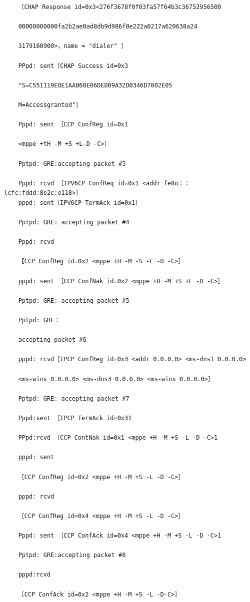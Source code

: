 \begin{verbatim}
    ［CHAP Response id=0x3<276f3678f0f03fa57f64b3c36752956500
    
    00000000000fa2b2ae0ad8db9d986f8e222a0217a620638a24
    
    3179160900>，name = "dialer" ］
    
    PPpd: sent［CHAP Success id=0x3
    
    "S=C551119EOE1AAB68E86DED09A32D0346D7002E05
    
    M=Accessgranted"］
    
    Pppd: sent ［CCP ConfReg id=0x1
    
    <mppe +tH -M +S +L-D -C>］
    
    Pptpd: GRE:accepting packet #3
    
    Pppd: rcvd ［IPV6CP ConfReq id=0x1 <addr fe8o：：lcfc:fddd:8e2c:e118>］
    pppd: sent［IPV6CP TermAck id=0x1］
    
    Pptpd: GRE: accepting packet #4
    
    Pppd: rcvd
    
    【CCP ConfReg id=0x2 <mppe +H -M -S -L -D -C>］
    
    pppd: sent ［CCP ConfNak id=0x2 <mppe +H -M +S +L -D -C>］
    
    Pptpd: GRE: accepting packet #5
    
    Pptpd: GRE：
    
    accepting packet #6
    
    pppd: rcvd［IPCP ConfReg id=0x3 <addr 0.0.0.0> <ms-dns1 0.0.0.0>
    
    <ms-wins 0.0.0.0> <ms-dns3 0.0.0.0> <ms-wins 0.0.0.0>］
    
    Pptpd: GRE: accepting packet #7
    
    Pppd:sent ［IPCP TermAck id=0x31
    
    PPpd:rcvd ［CCP ContNak id=0x1 <mppe +H -M +S -L -D -C>1
    
    pppd: sent
    
    ［CCP ConfReg id=0x2 <mppe +H -M +S -L -D -C>］
    
    pppd: rcvd
    
    ［CCP ConfReg id=0x4 <mppe +H -M +S -L -D -C>］
    
    Pppd: sent ［CCP ConfAck id=0x4 <mppe +H -M +S -L -D -C>1
    
    Pptpd: GRE:accepting packet #8
    
    pppd:rcvd
    
    ［CCP ConfAck id=0x2 <mppe +H -M +S -L -D-C>］
    

\end{verbatim}
